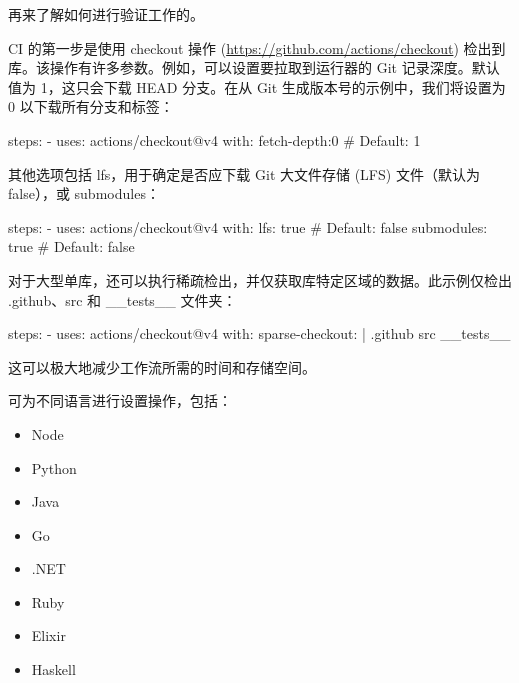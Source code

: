
再来了解如何进行验证工作的。


CI 的第一步是使用 checkout 操作 (\url{https://github.com/actions/checkout}) 检出到库。该操作有许多参数。例如，可以设置要拉取到运行器的 Git 记录深度。默认值为 1，这只会下载 HEAD 分支。在从 Git 生成版本号的示例中，我们将设置为 0 以下载所有分支和标签：

\begin{shell}
steps:
  - uses: actions/checkout@v4
    with:
      fetch-depth:0 # Default: 1
\end{shell}

其他选项包括 lfs，用于确定是否应下载 Git 大文件存储 (LFS) 文件（默认为 false），或 submodules：

\begin{shell}
steps:
  - uses: actions/checkout@v4
    with:
      lfs: true # Default: false
      submodules: true # Default: false
\end{shell}
  
对于大型单库，还可以执行稀疏检出，并仅获取库特定区域的数据。此示例仅检出 .github、src 和 \_\_tests\_\_ 文件夹：

\begin{shell}
steps:
  - uses: actions/checkout@v4
    with:
      sparse-checkout: |
        .github
        src
        __tests__
\end{shell}

这可以极大地减少工作流所需的时间和存储空间。


可为不同语言进行设置操作，包括：

\begin{itemize}
\item 
Node

\item
Python

\item
Java

\item
Go

\item
.NET

\item
Ruby

\item
Elixir

\item
Haskell
\end{itemize}

